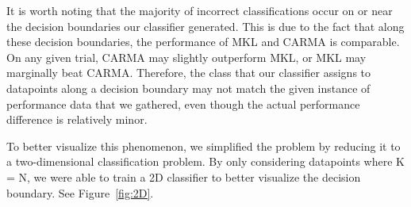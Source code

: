 It is worth noting that the majority of incorrect classifications occur on or near the decision boundaries our classifier generated.
This is due to the fact that along these decision boundaries, the performance of MKL and CARMA is comparable.
On any given trial, CARMA may slightly outperform MKL, or MKL may marginally beat CARMA.
Therefore, the class that our classifier assigns to datapoints along a decision boundary may not match the given instance of performance data that we gathered, even though the actual performance difference is relatively minor.

To better visualize this phenomenon, we simplified the problem by reducing it to a two-dimensional classification problem.
By only considering datapoints where K = N, we were able to train a 2D classifier to better visualize the decision boundary.
See Figure~\ref{fig:2D}.

